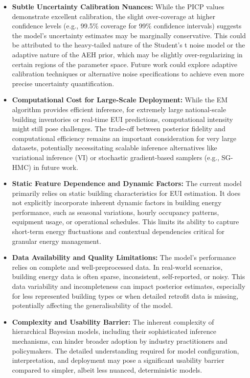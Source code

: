 \begin{itemize}
\item \textbf{Subtle Uncertainty Calibration Nuances:} While the PICP values demonstrate excellent calibration, the slight over-coverage at higher confidence levels (e.g., 99.5\% coverage for 99\% confidence intervals) suggests the model's uncertainty estimates may be marginally conservative. This could be attributed to the heavy-tailed nature of the Student's t noise model or the adaptive nature of the AEH prior, which may be slightly over-regularizing in certain regions of the parameter space. Future work could explore adaptive calibration techniques or alternative noise specifications to achieve even more precise uncertainty quantification.

\item \textbf{Computational Cost for Large-Scale Deployment:} While the EM algorithm provides efficient inference, for extremely large national-scale building inventories or real-time EUI predictions, computational intensity might still pose challenges. The trade-off between posterior fidelity and computational efficiency remains an important consideration for very large datasets, potentially necessitating scalable inference alternatives like variational inference (VI) or stochastic gradient-based samplers (e.g., SG-HMC) in future work.

\item \textbf{Static Feature Dependence and Dynamic Factors:} The current model primarily relies on static building characteristics for EUI estimation. It does not explicitly incorporate inherent dynamic factors in building energy performance, such as seasonal variations, hourly occupancy patterns, equipment usage, or operational schedules. This limits its ability to capture short-term energy fluctuations and contextual dependencies critical for granular energy management.

\item \textbf{Data Availability and Quality Limitations:} The model's performance relies on complete and well-preprocessed data. In real-world scenarios, building energy data is often sparse, inconsistent, self-reported, or noisy. This data variability and incompleteness can impact posterior estimates, especially for less represented building types or when detailed retrofit data is missing, potentially affecting the generalisability of the model.

\item \textbf{Complexity and Usability Barrier:} The inherent complexity of hierarchical Bayesian models, including their sophisticated inference mechanisms, can hinder broader adoption by industry practitioners and policymakers. The detailed understanding required for model configuration, interpretation, and deployment may pose a significant usability barrier compared to simpler, albeit less nuanced, deterministic models.


\end{itemize}
